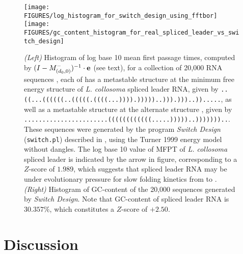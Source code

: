 \begin{figure}[!tbph]
\begin{center}
\texttt{[image: FIGURES/log\_histogram\_for\_switch\_design\_using\_fftbor]}
\texttt{[image: FIGURES/gc\_content\_histogram\_for\_real\_spliced\_leader\_vs\_switch\_design]}
\caption{\small
{\em (Left)}
Histogram of log base 10 mean first passage times,
computed by $(I - M^{-}_{(d_0,0)})^{-1} \cdot {\bf e}$ (see text),
for a collection of 20,000 RNA sequences \seq, each of has a metastable
structure at the minimum free energy structure \strA of
{\em L. collosoma} spliced leader RNA, given by
{\tiny \tt ..((...((((((..(((((.((((...)))).)))))..))).)))..)).....},
as well as a metastable structure at the alternate structure \strB,
given by
{\tiny \tt .......................((((((((((((.....)))))..)))))))..}.
These sequences were generated by the program {\em Switch Design}
({\tt switch.pl}) described in \cite{Flamm.r01}, using the Turner 1999
energy model without dangles.
The log base 10 value of MFPT of {\em L. collosoma} spliced leader
is indicated by the arrow in figure, corresponding to a $Z$-score of
$1.989$, which suggests
that spliced leader RNA may be under evolutionary pressure
for slow folding kinetics from \strA to \strB.
{\em (Right)} Histogram of GC-content of the 20,000 sequences generated
by {\em Switch Design}. Note that GC-content of spliced leader RNA is
$30.357\%$, which constitutes a $Z$-score of
$+2.50$.
}
\end{center}
\label{fig:histogramMFPT}
\end{figure}



\section{Discussion}
\label{section:discussion}


